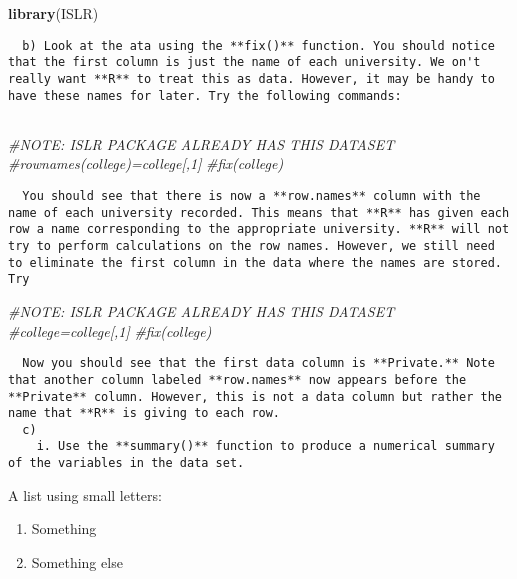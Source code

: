 \documentclass[
]{article}
\newenvironment{Shaded}{\begin{snugshade}}{\end{snugshade}}
\newcommand{\CommentTok}[1]{\textcolor[rgb]{0.56,0.35,0.01}{\textit{#1}}}
\newcommand{\KeywordTok}[1]{\textcolor[rgb]{0.13,0.29,0.53}{\textbf{#1}}}
\newcommand{\NormalTok}[1]{#1}
\providecommand{\tightlist}{%
  \setlength{\itemsep}{0pt}\setlength{\parskip}{0pt}}
\begin{document}
\begin{Shaded}
\begin{Highlighting}[]
\KeywordTok{library}\NormalTok{(ISLR)}
\end{Highlighting}
\end{Shaded}

\begin{verbatim}
  b) Look at the ata using the **fix()** function. You should notice that the first column is just the name of each university. We on't really want **R** to treat this as data. However, it may be handy to have these names for later. Try the following commands:
  
\end{verbatim}

\begin{Shaded}
\begin{Highlighting}[]
\CommentTok{#NOTE: ISLR PACKAGE ALREADY HAS THIS DATASET}
\CommentTok{#rownames(college)=college[,1]}
\CommentTok{#fix(college)}
\end{Highlighting}
\end{Shaded}

\begin{verbatim}
  You should see that there is now a **row.names** column with the name of each university recorded. This means that **R** has given each row a name corresponding to the appropriate university. **R** will not try to perform calculations on the row names. However, we still need to eliminate the first column in the data where the names are stored. Try
\end{verbatim}

\begin{Shaded}
\begin{Highlighting}[]
\CommentTok{#NOTE: ISLR PACKAGE ALREADY HAS THIS DATASET}
\CommentTok{#college=college[,1]}
\CommentTok{#fix(college)}
\end{Highlighting}
\end{Shaded}

\begin{verbatim}
  Now you should see that the first data column is **Private.** Note that another column labeled **row.names** now appears before the **Private** column. However, this is not a data column but rather the name that **R** is giving to each row.
  c) 
    i. Use the **summary()** function to produce a numerical summary of the variables in the data set.
\end{verbatim}

A list using small letters:

\begin{enumerate}
\def\labelenumi{\alph{enumi})}
\tightlist
\item
  Something
\item
  Something else
\end{enumerate}
\end{document}
